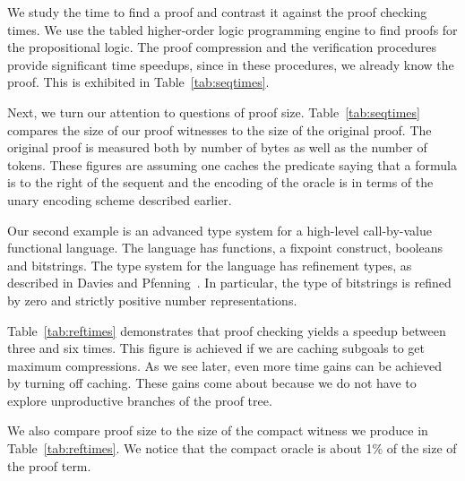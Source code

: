 \documentclass{llncs}
\begin{document}
We study the time to find a proof and contrast it against the proof
checking times. We use the tabled higher-order logic programming
engine \cite{Pientka05,Pientka03phd} to find proofs for the
propositional logic. The proof compression and the verification procedures
provide significant time speedups, since in these procedures, we already
know the proof. This is exhibited in Table~\ref{tab:seqtimes}.

Next, we turn our attention to questions of proof size.
Table~\ref{tab:seqtimes} compares the size of our proof witnesses to
the size of the original proof. The original proof is measured both by
number of bytes as well as the number of tokens. These figures are
assuming one caches the predicate saying that a formula is to the
right of the sequent and the encoding of the oracle is in terms of the
unary encoding scheme described earlier.

Our second example is an advanced type system for a high-level
call-by-value functional language. The language has functions, a
fixpoint construct, booleans and bitstrings. The type system for the
language has refinement types, as described in Davies and
Pfenning~\cite{davies+:intersection}. In particular, the type of
bitstrings is refined by zero and strictly positive number
representations.

Table~\ref{tab:reftimes} demonstrates that proof checking yields a
speedup between three and six times. This figure is achieved if we are
caching subgoals to get maximum compressions. As we see later, even
more time gains can be achieved by turning off caching.
These gains come about because we do not have to explore unproductive
branches of the proof tree.

We also compare proof size to the size of the compact witness we
produce in Table~\ref{tab:reftimes}. We notice that the compact oracle
is about 1\% of the size of the proof term.
\end{document}
